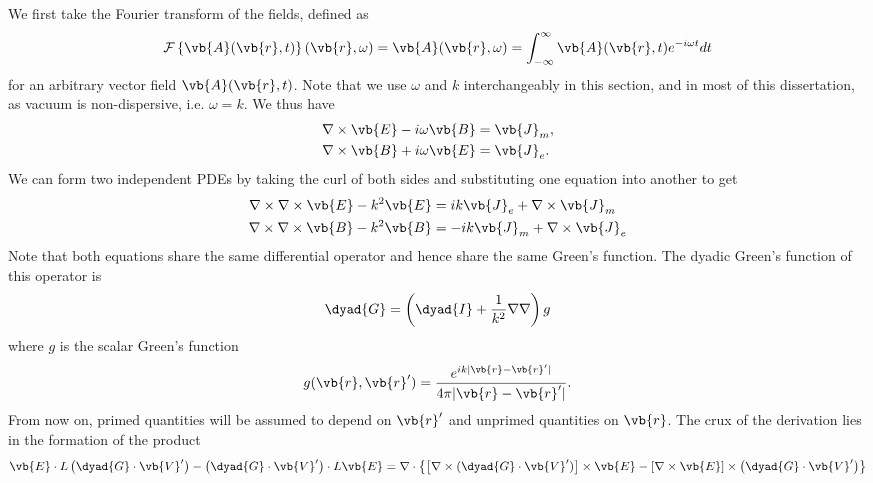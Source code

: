 \documentclass[11pt,SymmetricalJury]{inrsthesis/inrsthesis}
\begin{document}
We first take the Fourier transform of the fields, defined as
  \begin{equation}
    \mathcal{F}\left\{\vb{A}(\vb{r},t)\right\}(\vb{r},\omega)
                      = \vb{A}(\vb{r},\omega)
                      = \int_{-\infty}^\infty \vb{A}(\vb{r},t)e^{-i\omega t }dt
  \end{equation}
for an arbitrary vector field $\vb{A}(\vb{r},t)$.
Note that we use $\omega$ and $k$ interchangeably in this section, and in most of
this dissertation, as vacuum is non-dispersive, i.e. $\omega=k$. We thus have
  \begin{subequations}
  \begin{align}
    \nabla\times\vb{E} - i\omega\vb{B} &= \vb{J}_m, \\
    \nabla\times\vb{B} + i\omega\vb{E} &= \vb{J}_e.
  \end{align}
  \end{subequations}
We can form two independent PDEs by taking the curl of both sides
and substituting one equation into another to get
  \begin{subequations}
  \label{eq:sc.inhomogeneous-wave-equations}
  \begin{align}
    \nabla\times\nabla\times\vb{E} - k^2\vb{E} &= ik\vb{J}_e + \nabla\times\vb{J}_m \\
    \nabla\times\nabla\times\vb{B} - k^2\vb{B} &=-ik\vb{J}_m + \nabla\times\vb{J}_e
  \end{align}
  \end{subequations}
Note that both equations share the same differential operator and hence share the
same Green's function. The dyadic Green's function of this operator is
  \begin{equation}
    \dyad{G} = \left(\dyad{I}+\frac{1}{k^2}\nabla\nabla\right)g
  \end{equation}
where $g$ is the scalar Green's function
  \begin{equation}
    g(\vb{r},\vb{r}') = \frac{e^{ik|\vb{r}-\vb{r}'|}}{4\pi|\vb{r}-\vb{r}'|}.
  \end{equation}
From now on, primed quantities will be assumed to depend on $\vb{r}'$ and
unprimed quantities on $\vb{r}$. The crux of the derivation lies in the formation of the product
  \begin{equation}
    \vb{E}\cdot L\left(\dyad{G}\cdot\vb{V}'\right) - \left(\dyad{G}\cdot\vb{V}'\right)\cdot L\vb{E}
     = \nabla\cdot\left\{\left[\nabla\times(\dyad{G}\cdot\vb{V}')\right]\times\vb{E}-\left[\nabla\times\vb{E}\right]\times\left(\dyad{G}\cdot\vb{V}'\right)\right\}
  \end{equation}
\end{document}
